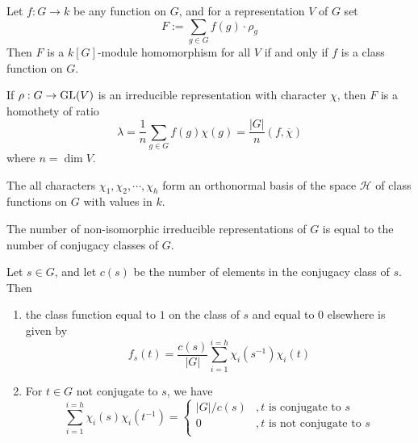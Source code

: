 \documentclass[12pt, oneside]{book}
\begin{document}
\begin{lemma}
    Let $f:G\rightarrow k$ be any function on $G$, and for a representation $V$ of $G$ set
    \begin{equation*}
        F
        :=
        \sum_{g \in G} f(g) \cdot \rho_g
    \end{equation*}
    Then $F$ is a $k[G]$-module homomorphism for all $V$ if and only if $f$ is a class function on $G$.
\end{lemma}
\begin{corollary}
    If $\rho:G \to \operatorname{\operatorname{GL}}(V)$ is an irreducible representation with character $\chi$, then $F$ is a homothety of ratio
    \begin{equation*}
        \lambda=
        \frac{1}{n}\sum_{g \in G} f(g) \chi(g)
        =
        \frac{\left|G\right|}{n} \left(f,\overline{\chi} \right)
    \end{equation*}
    where $n=\dim V$.
\end{corollary}


\begin{theorem}
    The all characters $\chi_1,\chi_2,\cdots ,\chi_h$ form an orthonormal basis of the space $\mathcal{H}$ of class functions on $G$ with values in $k$.

    The number of non-isomorphic irreducible representations of $G$ is equal to the number of conjugacy classes of $G$.
\end{theorem}

\begin{proposition}
    Let $s \in G$, and let $c(s)$ be the number of elements in the conjugacy class of $s$. Then
    \begin{enumerate}
        \item
              the class function equal to $1$ on the class of $s$ and equal to 0 elsewhere is given by
              \begin{equation*}
                  f_s(t)=\frac{c(s)}{|G| } \sum_{i=1}^{i=h} \chi_i(s^{-1}) \chi_i(t)
              \end{equation*}
        \item
              For $t \in G$ not conjugate to $s$, we have
              \begin{equation*}
                  \sum_{i=1}^{i=h} \chi_i(s) \chi_i(t^{-1}) =\begin{cases}
                      \left|G\right| / c(s) & ,t \text{ is conjugate to } s     \\
                      0                     & ,t \text{ is not conjugate to } s \\
                  \end{cases}
              \end{equation*}
    \end{enumerate}
\end{proposition}
\end{document}
